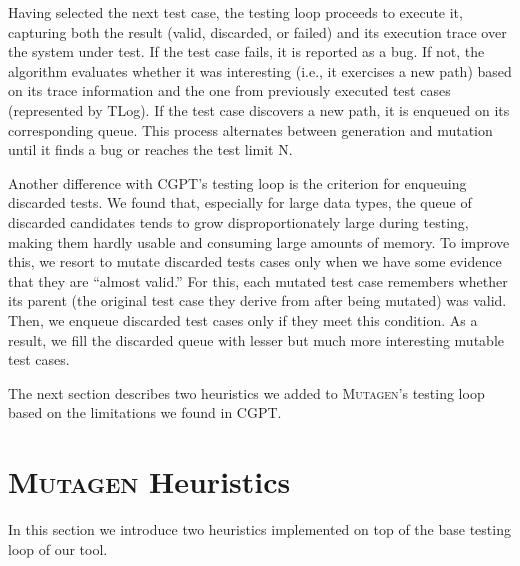 \documentclass[sigconf, anonymous, review]{acmart}
\newcommand{\mutagen}{\textsc{Mutagen}\xspace}
\begin{document}
Having selected the next test case, the testing loop proceeds to execute it,
capturing both the result (valid, discarded, or failed) and its execution trace
over the system under test.
%
If the test case fails, it is reported as a bug.
%
If not, the algorithm evaluates whether it was interesting (i.e., it exercises a
new path) based on its trace information and the one from previously executed
test cases (represented by TLog).
%
If the test case discovers a new path, it is enqueued on its corresponding
queue.
%
%
This process alternates between generation and mutation until it finds a bug or
reaches the test limit N.


Another difference with CGPT's testing loop is the criterion for enqueuing
discarded tests.
%
We found that, especially for large data types, the queue of discarded
candidates tends to grow disproportionately large during testing, making them
hardly usable and consuming large amounts of memory.
%
To improve this, we resort to mutate discarded tests cases only when we have
some evidence that they are ``almost valid.''
%
For this, each mutated test case remembers whether its parent (the original test
case they derive from after being mutated) was valid.
%
Then, we enqueue discarded test cases only if they meet this condition.
%
As a result, we fill the discarded queue with lesser but much more interesting
mutable test cases.


The next section describes two heuristics we added to \mutagen's testing loop
based on the limitations we found in CGPT.
%



\section{\mutagen Heuristics}
\label{sec:heuristics}


In this section we introduce two heuristics implemented on top of the base
testing loop of our tool.
\end{document}
